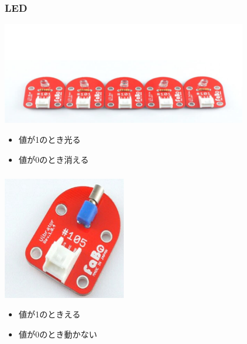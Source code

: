\begin{frame}
    \frametitle{LED}
    \begin{center}
        \includegraphics[width=0.8\textwidth]{images/chap05/text05-img016.png}
        \begin{itemize}
            \item 値が1のとき光る
            \item 値が0のとき消える
        \end{itemize}
    \end{center}
\end{frame}

\begin{frame}
    \frametitle{}
    \begin{center}
        \includegraphics[width=0.4\textwidth]{images/chap05/text05-img017.png}
        \begin{itemize}
            \item 値が1のときえる
            \item 値が0のとき動かない
        \end{itemize}
    \end{center}
\end{frame}


